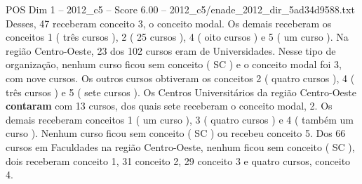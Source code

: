 \begin{textsample}{POS Dim 1 – 2012\_c5 – Score 6.00 – 2012\_c5/enade\_2012\_dir\_5ad34d9588.txt}
Desses, 47 receberam conceito 3, o conceito modal.
Os demais receberam os conceitos 1 ( três cursos ), 2 ( 25 cursos ), 4 ( oito cursos ) e 5 ( um curso ).
Na região Centro-Oeste, 23 dos 102 cursos eram de Universidades.
Nesse tipo de organização, nenhum curso ficou sem conceito ( SC ) e o conceito modal foi 3, com nove cursos.
Os outros cursos obtiveram os conceitos 2 ( quatro cursos ), 4 ( três cursos ) e 5 ( sete cursos ).
Os Centros Universitários da região Centro-Oeste \textbf{contaram} com 13 cursos, dos quais sete receberam o conceito modal, 2.
Os demais receberam conceitos 1 ( um curso ), 3 ( quatro cursos ) e 4 ( também um curso ).
Nenhum curso ficou sem conceito ( SC ) ou recebeu conceito 5.
Dos 66 cursos em Faculdades na região Centro-Oeste, nenhum ficou sem conceito ( SC ), dois receberam conceito 1, 31 conceito 2, 29 conceito 3 e quatro cursos, conceito 4.

\end{textsample}
